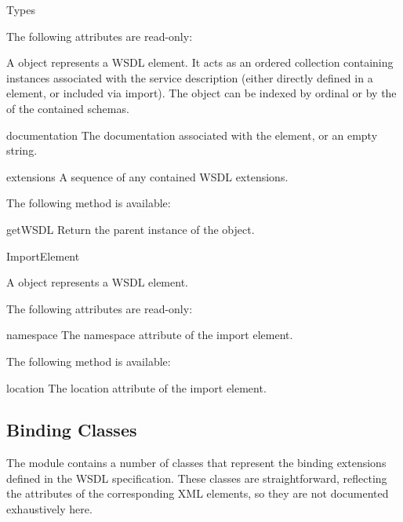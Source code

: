\begin{classdesc}{Types}{}

The following attributes are read-only:

A  object represents a WSDL  element. It acts 
as an ordered collection containing  instances associated 
with the service description (either directly defined in a  
element, or included via import). The  object can be indexed 
by ordinal or by the  of the contained schemas.

\begin{memberdesc}{documentation}
The documentation associated with the element, or an empty string.
\end{memberdesc}

\begin{memberdesc}{extensions}
A sequence of any contained WSDL extensions.
\end{memberdesc}

The following method is available:

\begin{methoddesc}{getWSDL}{}
Return the parent  instance of the object.
\end{methoddesc}
\end{classdesc}

\begin{classdesc}{ImportElement}{}

A  object represents a WSDL  element.

The following attributes are read-only:

\begin{memberdesc}{namespace}
The namespace attribute of the import element.
\end{memberdesc}

The following method is available:

\begin{memberdesc}{location}
The location attribute of the import element.
\end{memberdesc}
\end{classdesc}


\subsection{Binding Classes}

The  module contains a number of classes that represent 
the binding extensions defined in the WSDL specification. These classes 
are straightforward, reflecting the attributes of the corresponding 
XML elements, so they are not documented exhaustively here.

